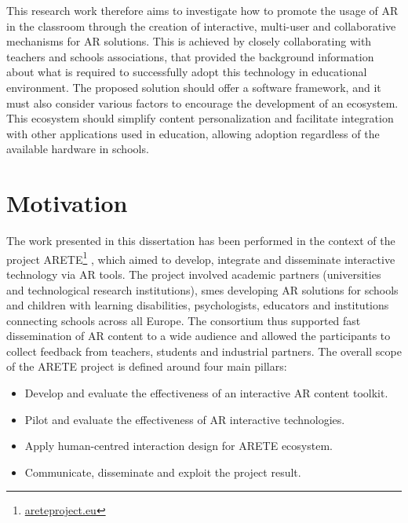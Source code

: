 This research work therefore aims to investigate how to promote the usage of AR in the classroom through the creation of interactive, multi-user and collaborative mechanisms for AR solutions. This is achieved by closely collaborating with teachers and schools associations, that provided the background information about what is required to successfully adopt this technology in educational environment. The proposed solution should offer a software framework, and it must also consider various factors to encourage the development of an ecosystem. This ecosystem should simplify content personalization and facilitate integration with other applications used in education, allowing adoption regardless of the available hardware in schools.

\section{Motivation}\label{sec:motivation}
The work presented in this dissertation has been performed in the context of the project ARETE\footnote{\url{areteproject.eu}} \citep{masneri2020work}, which aimed to develop, integrate and disseminate interactive technology via AR tools. The project involved academic partners (universities and technological research institutions), \glspl{sme} developing AR solutions for schools and children with learning disabilities, psychologists, educators and institutions connecting schools across all Europe. The consortium thus supported fast dissemination of AR content to a wide audience and allowed the participants to collect feedback from teachers, students and industrial partners. The overall scope of the ARETE project is defined around four main pillars:

\begin{itemize}
    \item Develop and evaluate the effectiveness of an interactive AR content toolkit.
    \item Pilot and evaluate the effectiveness of AR interactive technologies.
    \item Apply human-centred interaction design for ARETE ecosystem.
    \item Communicate, disseminate and exploit the project result.
\end{itemize}


